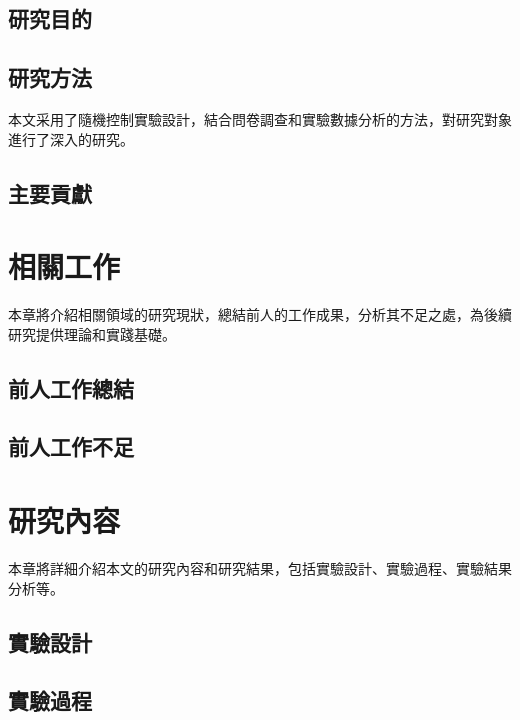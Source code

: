 \documentclass[
    writingLanguage=chinese,
    addPageTitle=on,
    addDeclaration=on,
    addMUSTlog=off,
    printing=off,
    refIndent=on,
    addFigTOC=on,
    addTabTOC=on,
]{.def/must}
\begin{document}
\subsection{研究目的}

\txtHere[2]

\subsection{研究方法}

本文采用了隨機控制實驗設計，結合問卷調查和實驗數據分析的方法，對研究對象進行了深入的研究。

\subsection{主要貢獻}

\txtHere[3]

\section{相關工作}

本章將介紹相關領域的研究現狀，總結前人的工作成果，分析其不足之處，為後續研究提供理論和實踐基礎。

\subsection{前人工作總結}

\txtHere[4]

\subsection{前人工作不足}

\txtHere[5]

\section{研究內容}

本章將詳細介紹本文的研究內容和研究結果，包括實驗設計、實驗過程、實驗結果分析等。

\subsection{實驗設計}

\txtHere[6]

\subsection{實驗過程}
\end{document}
